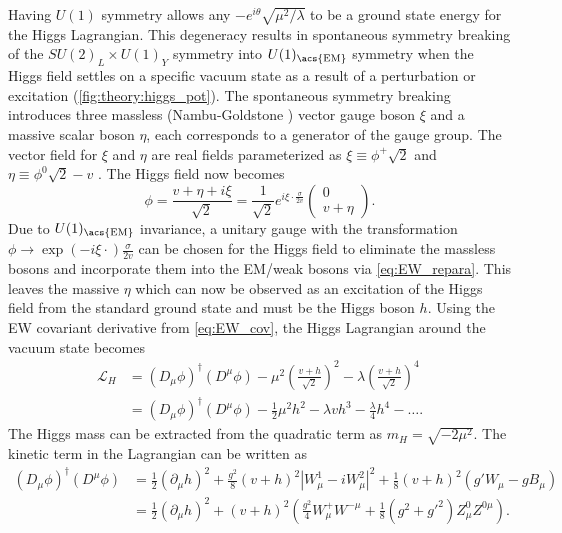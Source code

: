 \documentclass[../thesis.tex]{subfiles}
\begin{document}
Having $U(1)$ symmetry allows any $-e^{i\theta}\sqrt{\mu^2/\lambda}$ to be a ground state energy for the Higgs Lagrangian. This degeneracy results in spontaneous symmetry breaking of the $SU(2)_L\times U(1)_Y$ symmetry into $U(1)_\text{\acs{EM}}$ symmetry when the Higgs field settles on a specific vacuum state as a result of a perturbation or excitation (\autoref{fig:theory:higgs_pot}). The spontaneous symmetry breaking introduces three massless (Nambu-Goldstone \citep{theory:nambu_goldstone}) vector gauge boson $\xi$ and a massive scalar boson $\eta$, each corresponds to a generator of the gauge group. The vector field for $\xi$ and $\eta$ are real fields parameterized as $\xi \equiv \phi^+\sqrt{2}$ and $\eta \equiv \phi^0\sqrt{2}-v$ \citep{theory:higgs_physics}. The Higgs field now becomes
\begin{equation}
\phi=\frac{v+\eta+i\xi}{\sqrt{2}}=
\frac{1}{\sqrt{2}}e^{i\xi\cdot\displaystyle\frac{\sigma}{2v}}
\begin{pmatrix}
0 \\ v+\eta
\end{pmatrix}.
\end{equation}
Due to $U(1)_\text{\acs{EM}}$ invariance, a unitary gauge with the transformation $\phi \rightarrow \exp(-i\xi\cdot)\frac{\sigma}{2v}$ can be chosen for the Higgs field to eliminate the massless bosons and incorporate them into the \acs{EM}/weak bosons via \autoref{eq:EW_repara}. This leaves the massive $\eta$ which can now be observed as an excitation of the Higgs field from the standard ground state and must be the Higgs boson $h$. Using the \acs{EW} covariant derivative from \autoref{eq:EW_cov}, the Higgs Lagrangian around the vacuum state becomes
\begin{equation}
\begin{aligned}
\mathcal{L}_H &= \left(D_\mu\phi\right)^\dagger \left(D^\mu\phi\right) - \mu^2\left(\displaystyle\frac{v+h}{\sqrt{2}}\right)^2-\lambda\left(\displaystyle\frac{v+h}{\sqrt{2}}\right)^4 \\
&= \left(D_\mu\phi\right)^\dagger \left(D^\mu\phi\right) - \frac{1}{2}\mu^2h^2 - \lambda v h^3 - \frac{\lambda}{4} h^4 - \ldots.
\end{aligned}
\end{equation}
The Higgs mass can be extracted from the quadratic term as $m_H = \sqrt{-2\mu^2}$. The kinetic term in the Lagrangian can be written as
\begin{equation}
\begin{aligned}
\left(D_\mu\phi\right)^\dagger \left(D^\mu\phi\right) 
&= \frac{1}{2}(\partial_\mu h)^2 + \frac{g^2}{8}(v+h)^2\left|W^1_\mu -iW^2_\mu\right|^2 + \frac{1}{8}(v+h)^2\left(g'W_\mu-gB_\mu\right) \\
&= \frac{1}{2}(\partial_\mu h)^2 + (v+h)^2 \left( \frac{g^2}{4}W^{+}_{\mu} W^{-\mu }+\frac{1}{8} \left(g^2+g'^2\right)Z^{0}_{\mu} Z^{0\mu} \right).
\end{aligned}
\end{equation}
\end{document}
